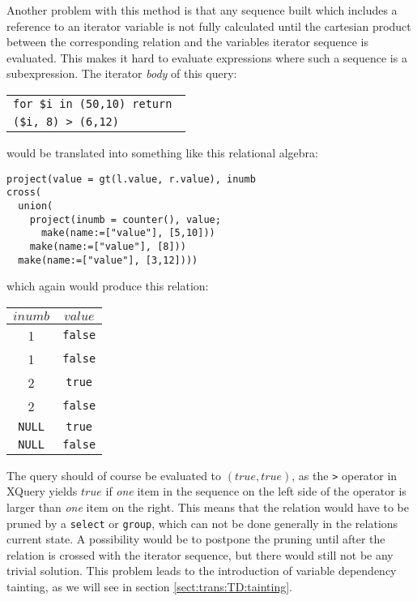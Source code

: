 Another problem with this method is that any sequence built which includes a reference to an iterator variable is
not fully calculated until the cartesian product between the corresponding relation and the variables iterator
sequence is evaluated. This makes it hard to evaluate expressions where such a sequence is a subexpression. The
iterator \textit{body} of this query:


\begin{center}
\begin{tabular}{l}
\texttt{for \$i in (50,10) return } \\ \qquad
\texttt{(\$i, 8) > (6,12)}
\end{tabular}
\end{center}

would be translated into something like this relational algebra:

\begin{Verbatim}
project(value = gt(l.value, r.value), inumb
cross(
  union(
    project(inumb = counter(), value;
      make(name:=["value"], [5,10]))
    make(name:=["value"], [8]))
  make(name:=["value"], [3,12])))
\end{Verbatim}

which again would produce this relation:

\begin{figure*}[!h]
\centering
\begin{tabular}{|c|c|} \hline
$inumb$ & $value$ \\\hline
1 & \texttt{false} \\\hline
1 & \texttt{false} \\\hline
2 & \texttt{true} \\\hline
2 & \texttt{false} \\\hline
\texttt{NULL} & \texttt{true} \\\hline
\texttt{NULL} & \texttt{false} \\\hline
\end{tabular}
\end{figure*}

The query should of course be evaluated to $(true, true)$, as the \texttt{>} operator in XQuery yields $true$ if
\textit{one} item in the sequence on the left side of the operator is larger than \textit{one} item on the right.
This means that the relation would have to be pruned by a \texttt{select} or \texttt{group}, which can not be done
generally in the relations current state. A possibility would be to postpone the pruning until after the relation
is crossed with the iterator sequence, but there would still not be any trivial
solution. This problem leads to the introduction of variable dependency
tainting, as we will see in section \ref{sect:trans:TD:tainting}.
